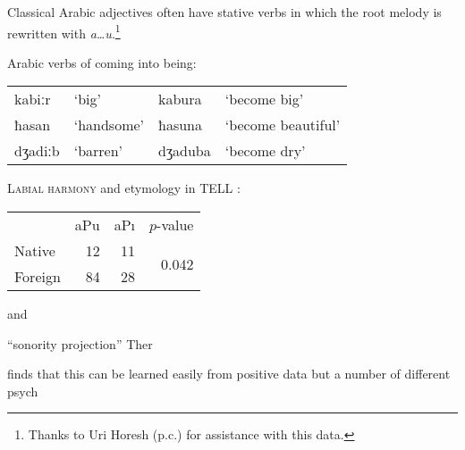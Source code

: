 Classical Arabic adjectives often have stative verbs in which the root melody is rewritten with \emph{a\ldots{}u}.\footnote{Thanks to Uri Horesh (p.c.) for assistance with this data.}

\begin{example}
Arabic verbs of coming into being: \\
\begin{tabular}{l l l l}
kabiːr  & `big'        & kabura  & `become big'       \\
ħasan   & `handsome'   & ħasuna  & `become beautiful' \\
dʒadiːb & `barren'     & dʒaduba & `become dry'       \\
\end{tabular}
\end{example}

 
\citet{Inkelas2001}

\begin{example}
\textsc{Labial harmony} and etymology in TELL \citep[][187]{Inkelas2001}: 

\vspace{0.5\baselineskip}
\begin{tabular}{l r r r}
        & aPu & aPı & $p$-value \\
Native  & 12  & 11  & \multirow{2}{*}{0.042} \\
Foreign & 84  & 28  \\
\end{tabular}
\end{example}

\citet{NiChiosain1993} and \citet{Ito1995b} 

``sonority projection''
Ther

\citet{Daland2011b} finds that this can be learned easily from positive data but a number of different psych


